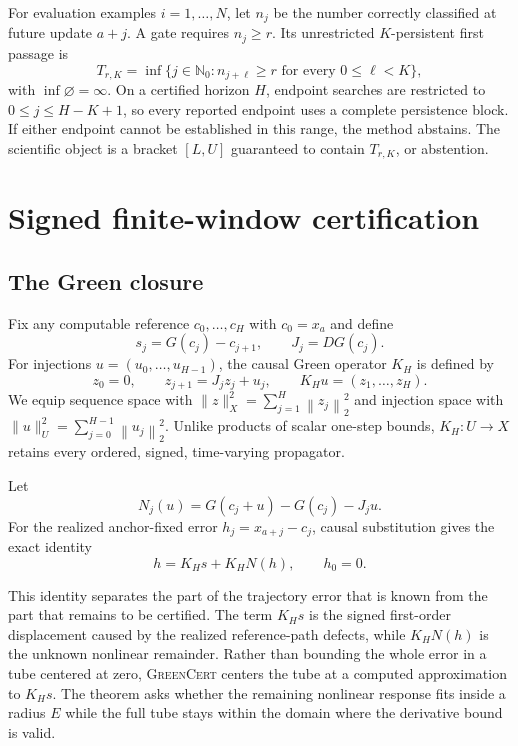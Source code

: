 \documentclass{article}
\newcommand{\norm}[1]{\left\lVert #1\right\rVert_2}
\newcommand{\method}{\textsc{GreenCert}}
\begin{document}
For evaluation examples $i=1,\ldots,N$, let $n_j$ be the number correctly
classified at future update $a+j$.  A gate requires $n_j\ge r$.  Its
unrestricted $K$-persistent first passage is
\begin{equation}
 T_{r,K}=\inf\{j\in\mathbb N_0:n_{j+\ell}\ge r
 \text{ for every }0\le\ell<K\},
 \label{eq:event}
\end{equation}
with $\inf\varnothing=\infty$.  On a certified horizon $H$, endpoint searches
are restricted to $0\le j\le H-K+1$, so every reported endpoint uses a
complete persistence block.  If either endpoint cannot be established in this
range, the method abstains.  The scientific object is a bracket $[L,U]$
guaranteed to contain $T_{r,K}$, or abstention.

\section{Signed finite-window certification}
\label{sec:method}

\subsection{The Green closure}

Fix any computable reference $c_0,\ldots,c_H$ with $c_0=x_a$ and define
\begin{equation}
 s_j=G(c_j)-c_{j+1},\qquad J_j=DG(c_j).
 \label{eq:defect}
\end{equation}
For injections $u=(u_0,\ldots,u_{H-1})$, the causal Green operator $K_H$ is
defined by
\begin{equation}
 z_0=0,\qquad z_{j+1}=J_jz_j+u_j,\qquad
 K_Hu=(z_1,\ldots,z_H).
 \label{eq:green}
\end{equation}
We equip sequence space with
$\lVert z\rVert_X^2=\sum_{j=1}^H\norm{z_j}^2$ and injection space with
$\lVert u\rVert_U^2=\sum_{j=0}^{H-1}\norm{u_j}^2$.  Unlike products of scalar
one-step bounds, $K_H:U\to X$ retains every ordered, signed, time-varying
propagator.

Let
\begin{equation}
 N_j(u)=G(c_j+u)-G(c_j)-J_ju.
 \label{eq:nonlinear-remainder}
\end{equation}
For the realized anchor-fixed error $h_j=x_{a+j}-c_j$, causal substitution
gives the exact identity
\begin{equation}
 h=K_Hs+K_HN(h),\qquad h_0=0.
 \label{eq:fixedpoint}
\end{equation}

This identity separates the part of the trajectory error that is known from
the part that remains to be certified.  The term $K_Hs$ is the signed
first-order displacement caused by the realized reference-path defects, while
$K_HN(h)$ is the unknown nonlinear remainder.  Rather than bounding the whole
error in a tube centered at zero, \method{} centers the tube at a computed
approximation to $K_Hs$.  The theorem asks whether the remaining nonlinear
response fits inside a radius $E$ while the full tube stays within the domain
where the derivative bound is valid.
\end{document}
